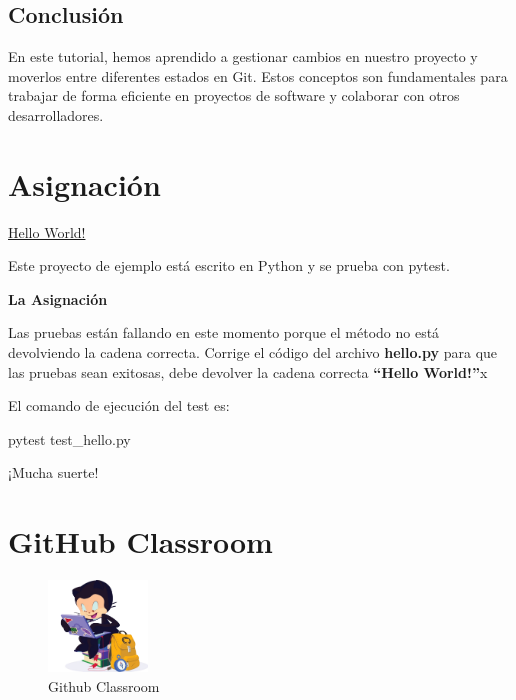 \documentclass[
  a4paper,
  DIV=11,
  numbers=noendperiod,
  onepage,
  openany]{scrreprt}
\newenvironment{Shaded}{\begin{snugshade}}{\end{snugshade}}
\newcommand{\ExtensionTok}[1]{\textcolor[rgb]{0.00,0.23,0.31}{#1}}
\newcommand{\NormalTok}[1]{\textcolor[rgb]{0.00,0.23,0.31}{#1}}
\begin{document}
\section{Conclusión}\label{conclusiuxf3n}

En este tutorial, hemos aprendido a gestionar cambios en nuestro
proyecto y moverlos entre diferentes estados en Git. Estos conceptos son
fundamentales para trabajar de forma eficiente en proyectos de software
y colaborar con otros desarrolladores.

\chapter{Asignación}\label{asignaciuxf3n}

\href{https://classroom.github.com/a/o-qydr2W}{Hello World!}

Este proyecto de ejemplo está escrito en Python y se prueba con pytest.

\textbf{La Asignación}

Las pruebas están fallando en este momento porque el método no está
devolviendo la cadena correcta. Corrige el código del archivo
\textbf{hello.py} para que las pruebas sean exitosas, debe devolver la
cadena correcta \textbf{``Hello World!''}x

El comando de ejecución del test es:

\begin{Shaded}
\begin{Highlighting}[]
\ExtensionTok{pytest}\NormalTok{ test\_hello.py}
\end{Highlighting}
\end{Shaded}

¡Mucha suerte!

\chapter{GitHub Classroom 📒}\label{github-classroom}

\begin{figure}[H]

{\centering \includegraphics[width=1.04167in,height=\textheight]{unidades/unidad0/../../images/github classroom.png}

}

\caption{Github Classroom}

\end{figure}%
\end{document}
